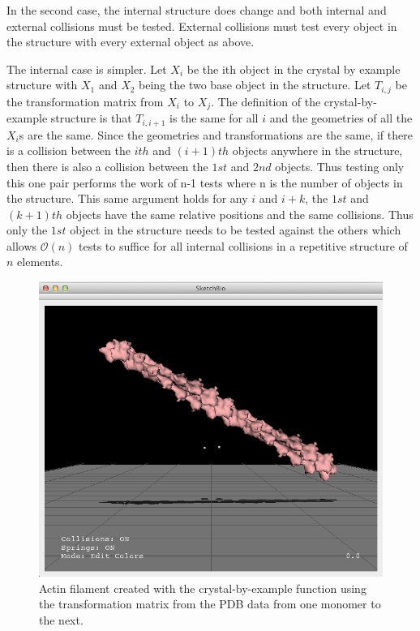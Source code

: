 \documentclass[twocolumn]{bmcart}%
\begin{document}
In the second case, the internal structure does change and both internal and external collisions must be tested.
External collisions must test every object in the structure with every external object as above.

The internal case is simpler.  Let $X_i$ be the ith object in the crystal by example structure with $X_1$ and $X_2$ being the two base object in the structure.
Let $T_{i,j}$ be the transformation matrix from $X_i$ to $X_j$.
The definition of the crystal-by-example structure is that $T_{i,i+1}$ is the same for all $i$ and the geometries of all the $X_i$s are the same.
Since the geometries and transformations are the same, if there is a collision between the $ith$ and $(i+1)th$ objects anywhere in the structure, then there is also a collision between the $1st$ and $2nd$ objects.
Thus testing only this one pair performs the work of n-1 tests where n is the number of objects in the structure.
This same argument holds for any $i$ and $i+k$, the $1st$ and $(k+1)th$ objects have the same relative positions and the same collisions.
Thus only the $1st$ object in the structure needs to be tested against the others which allows $\mathcal{O}(n)$ tests to suffice for all internal collisions in a repetitive structure of $n$ elements.

\begin{figure}[h]
\centering
\includegraphics[width=0.9\columnwidth]{crystal_actin.png}
\caption{Actin filament created with the crystal-by-example function using the transformation matrix from the PDB data from one monomer to the next.}
\label{fig:crystal_actin}
\end{figure}
\end{document}
